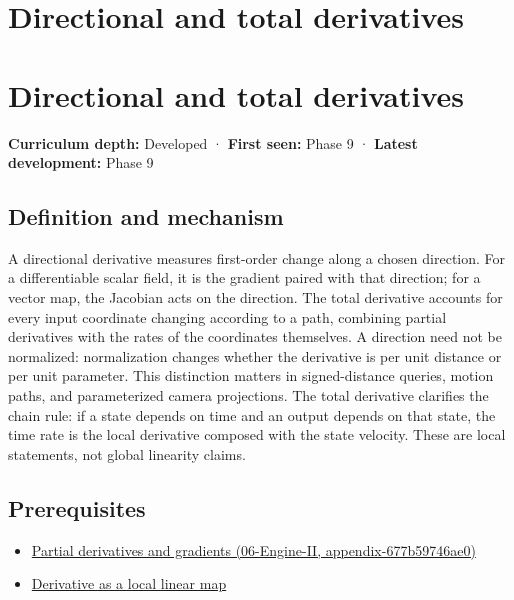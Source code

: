 \hypertarget{appendix-e2d476574aab}{}
\section*{Directional and total derivatives}
\section{Directional and total derivatives}\label{appendix-e2d476574aab-directional-and-total-derivatives}

\textbf{Curriculum depth:} Developed · \textbf{First seen:} Phase 9 · \textbf{Latest development:} Phase 9

\subsection{Definition and mechanism}\label{appendix-e2d476574aab-definition-and-mechanism}

A directional derivative measures first-order change along a chosen direction. For a differentiable scalar field, it is the gradient paired with that direction; for a vector map, the Jacobian acts on the direction. The total derivative accounts for every input coordinate changing according to a path, combining partial derivatives with the rates of the coordinates themselves. A direction need not be normalized: normalization changes whether the derivative is per unit distance or per unit parameter. This distinction matters in signed-distance queries, motion paths, and parameterized camera projections. The total derivative clarifies the chain rule: if a state depends on time and an output depends on that state, the time rate is the local derivative composed with the state velocity. These are local statements, not global linearity claims.

\subsection{Prerequisites}\label{appendix-e2d476574aab-prerequisites}

\begin{itemize}
\tightlist
\item
  \href{../06-Engine-II/main.pdf\#nameddest=appendix-677b59746ae0}{Partial derivatives and gradients (06-Engine-II, appendix-677b59746ae0)}
\item
  \hyperref[appendix-7bc181935c42]{Derivative as a local linear map}
\end{itemize}


